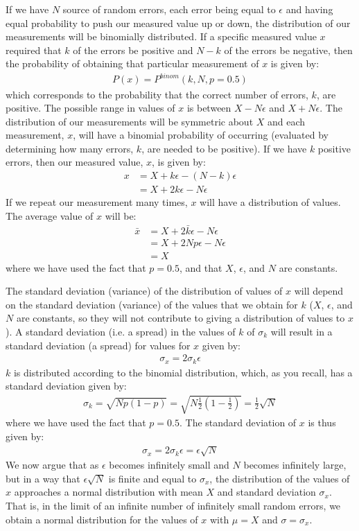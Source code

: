 If we have $N$ source of random errors, each error being equal to $\epsilon$ and having equal probability to push our measured value up or down, the distribution of our measurements will be binomially distributed. If a specific measured value $x$ required that $k$ of the errors be positive and $N-k$ of the errors be negative, then the probability of obtaining that particular measurement of $x$ is given by:
\begin{align*}
P(x)=P^{binom}(k,N,p=0.5)
\end{align*}
which corresponds to the probability that the correct number of errors, $k$, are positive. The possible range in values of $x$ is between $X-N\epsilon$ and $X+N\epsilon$. The distribution of our measurements will be symmetric about $X$ and each measurement, $x$, will have a binomial probability of occurring (evaluated by determining how many errors, $k$, are needed to be positive). If we have $k$ positive errors, then our measured value, $x$, is given by:
\begin{align*}
x&=X+k\epsilon-(N-k)\epsilon\\
&=X+2k\epsilon-N\epsilon
\end{align*}
If we repeat our measurement many times, $x$ will have a distribution of values. The average value of $x$ will be:
\begin{align*}
\bar x &=X+2\bar k\epsilon-N\epsilon\\
&=X+2Np\epsilon-N\epsilon\\
&=X
\end{align*}
where we have used the fact that $p=0.5$, and that $X$, $\epsilon$, and $N$ are constants. 

The standard deviation (variance) of the distribution of values of $x$ will depend on the standard deviation (variance) of the values that we obtain for $k$ ($X$, $\epsilon$, and $N$ are constants, so they will not contribute to giving a distribution of values to $x$). A standard deviation (i.e. a spread) in the values of $k$ of $\sigma_k$ will result in a standard deviation (a spread) for values for $x$ given by:
\begin{align}
\sigma_x=2 \sigma_k \epsilon
\end{align}
$k$ is distributed according to the binomial distribution, which, as you recall, has a standard deviation given by:
\begin{align}
\sigma_k=\sqrt{Np(1-p)}=\sqrt{N\frac{1}{2}(1-\frac{1}{2})}=\frac{1}{2}\sqrt{N}
\end{align}
where we have used the fact that $p=0.5$. The standard deviation of $x$ is thus given by:
\begin{align}
\sigma_x=2 \sigma_k \epsilon=\epsilon\sqrt{N}
\end{align}
We now argue that as $\epsilon$ becomes infinitely small and $N$ becomes infinitely large, but in a way that $\epsilon\sqrt{N}$ is finite and equal to $\sigma_x$, the distribution of the values of $x$ approaches a normal distribution with mean $X$ and standard deviation $\sigma_x$. That is, in the limit of an infinite number of infinitely small random errors, we obtain a normal distribution for the values of $x$ with $\mu=X$ and $\sigma=\sigma_x$. 

